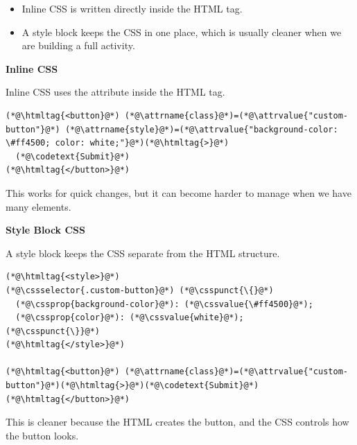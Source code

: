 \documentclass{article}
\begin{document}
\begin{itemize}
  \item Inline CSS is written directly inside the HTML tag.
  \item A style block keeps the CSS in one place, which is usually cleaner when we are building a full activity.
\end{itemize}

\vspace{0.3cm}

\noindent
\begin{minipage}[t]{0.48\textwidth}
  \textbf{\Bitter\textcolor{naranja}{Inline CSS}}

  \vspace{0.1cm}

  Inline CSS uses the  attribute inside the HTML tag.

  \begin{lstlisting}
(*@\htmltag{<button}@*) (*@\attrname{class}@*)=(*@\attrvalue{"custom-button"}@*) (*@\attrname{style}@*)=(*@\attrvalue{"background-color: \#ff4500; color: white;"}@*)(*@\htmltag{>}@*)
  (*@\codetext{Submit}@*)
(*@\htmltag{</button>}@*)
\end{lstlisting}

  This works for quick changes, but it can become harder to manage when we have many elements.
\end{minipage}
\hfill
\begin{minipage}[t]{0.48\textwidth}
  \textbf{\Bitter\textcolor{naranja}{Style Block CSS}}

  \vspace{0.1cm}

  A style block keeps the CSS separate from the HTML structure.

  \begin{lstlisting}
(*@\htmltag{<style>}@*)
(*@\cssselector{.custom-button}@*) (*@\csspunct{\{}@*)
  (*@\cssprop{background-color}@*): (*@\cssvalue{\#ff4500}@*);
  (*@\cssprop{color}@*): (*@\cssvalue{white}@*);
(*@\csspunct{\}}@*)
(*@\htmltag{</style>}@*)

(*@\htmltag{<button}@*) (*@\attrname{class}@*)=(*@\attrvalue{"custom-button"}@*)(*@\htmltag{>}@*)(*@\codetext{Submit}@*)(*@\htmltag{</button>}@*)
\end{lstlisting}

  This is cleaner because the HTML creates the button, and the CSS controls how the button looks.
\end{minipage}

\vspace{0.5cm}
\end{document}
